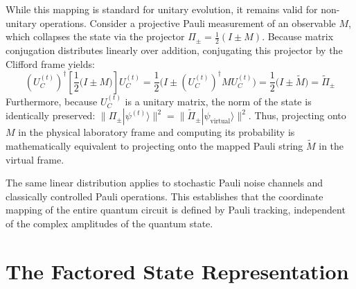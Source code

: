\documentclass[11pt]{article}
\begin{document}
While this mapping is standard for unitary evolution, it remains valid for non-unitary operations. Consider a projective Pauli measurement of an observable $M$, which collapses the state via the projector $\Pi_{\pm} = \frac{1}{2}(I \pm M)$. Because matrix conjugation distributes linearly over addition, conjugating this projector by the Clifford frame yields:
\begin{equation}
    (U_C^{(t)})^\dagger \left[ \frac{1}{2} \Big( I \pm M \Big) \right] U_C^{(t)} = \frac{1}{2} \Big( I \pm (U_C^{(t)})^\dagger M U_C^{(t)} \Big) = \frac{1}{2} \Big( I \pm \tilde{M} \Big) = \tilde{\Pi}_{\pm}
\end{equation}
Furthermore, because $U_C^{(t)}$ is a unitary matrix, the norm of the state is identically preserved: $\| \Pi_{\pm} |\psi^{(t)}\rangle \|^2 = \| \tilde{\Pi}_{\pm} |\psi_{\text{virtual}}\rangle \|^2$. Thus, projecting onto $M$ in the physical laboratory frame and computing its probability is mathematically equivalent to projecting onto the mapped Pauli string $\tilde{M}$ in the virtual frame.

The same linear distribution applies to stochastic Pauli noise channels and classically controlled Pauli operations. This establishes that the coordinate mapping of the entire quantum circuit is defined by Pauli tracking, independent of the complex amplitudes of the quantum state.

\section{The Factored State Representation}
\label{sec:representation}
\end{document}
